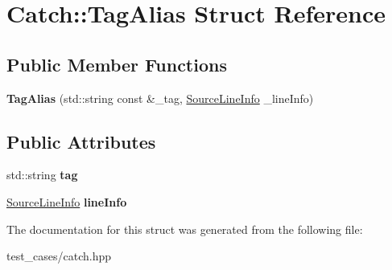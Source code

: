 \hypertarget{structCatch_1_1TagAlias}{}\section{Catch\+:\+:Tag\+Alias Struct Reference}
\label{structCatch_1_1TagAlias}
\subsection*{Public Member Functions}
\begin{DoxyCompactItemize}
\item 
\mbox{\label{structCatch_1_1TagAlias_ae5a030edfbc8e37f28310d4ca599396c}} 
{\bfseries Tag\+Alias} (std\+::string const \&\+\_\+tag, \hyperlink{structCatch_1_1SourceLineInfo}{Source\+Line\+Info} \+\_\+line\+Info)
\end{DoxyCompactItemize}
\subsection*{Public Attributes}
\begin{DoxyCompactItemize}
\item 
\mbox{\label{structCatch_1_1TagAlias_a950183883ab17c90d0fab16b966b6e2d}} 
std\+::string {\bfseries tag}
\item 
\mbox{\label{structCatch_1_1TagAlias_a2f51fe0b3c052561275d26b6eb88f702}} 
\hyperlink{structCatch_1_1SourceLineInfo}{Source\+Line\+Info} {\bfseries line\+Info}
\end{DoxyCompactItemize}


The documentation for this struct was generated from the following file\+:\begin{DoxyCompactItemize}
\item 
test\+\_\+cases/catch.\+hpp\end{DoxyCompactItemize}
